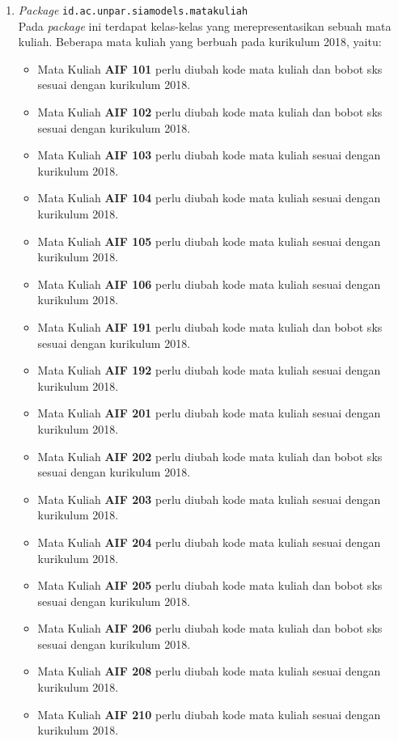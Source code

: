 \begin{enumerate}
	\item \textit{Package} \texttt{id.ac.unpar.siamodels.matakuliah} \\
	Pada \textit{package} ini terdapat kelas-kelas yang merepresentasikan sebuah mata kuliah. Beberapa mata kuliah yang berbuah pada kurikulum 2018, yaitu:
	\begin{itemize}
		\item Mata Kuliah \textbf{AIF 101} perlu diubah kode mata kuliah dan bobot sks sesuai dengan kurikulum 2018.
		\item Mata Kuliah \textbf{AIF 102} perlu diubah kode mata kuliah dan bobot sks sesuai dengan kurikulum 2018.
		\item Mata Kuliah \textbf{AIF 103} perlu diubah kode mata kuliah sesuai dengan kurikulum 2018.
		\item Mata Kuliah \textbf{AIF 104} perlu diubah kode mata kuliah sesuai dengan kurikulum 2018.
		\item Mata Kuliah \textbf{AIF 105} perlu diubah kode mata kuliah sesuai dengan kurikulum 2018.
		\item Mata Kuliah \textbf{AIF 106} perlu diubah kode mata kuliah sesuai dengan kurikulum 2018.
		\item Mata Kuliah \textbf{AIF 191} perlu diubah kode mata kuliah dan bobot sks sesuai dengan kurikulum 2018.
		\item Mata Kuliah \textbf{AIF 192} perlu diubah kode mata kuliah sesuai dengan kurikulum 2018.
		\item Mata Kuliah \textbf{AIF 201} perlu diubah kode mata kuliah sesuai dengan kurikulum 2018.
		\item Mata Kuliah \textbf{AIF 202} perlu diubah kode mata kuliah dan bobot sks sesuai dengan kurikulum 2018.
		\item Mata Kuliah \textbf{AIF 203} perlu diubah kode mata kuliah sesuai dengan kurikulum 2018.
		\item Mata Kuliah \textbf{AIF 204} perlu diubah kode mata kuliah sesuai dengan kurikulum 2018.
		\item Mata Kuliah \textbf{AIF 205} perlu diubah kode mata kuliah dan bobot sks sesuai dengan kurikulum 2018.
		\item Mata Kuliah \textbf{AIF 206} perlu diubah kode mata kuliah dan bobot sks sesuai dengan kurikulum 2018.
		\item Mata Kuliah \textbf{AIF 208} perlu diubah kode mata kuliah sesuai dengan kurikulum 2018.
		\item Mata Kuliah \textbf{AIF 210} perlu diubah kode mata kuliah sesuai dengan kurikulum 2018.

\end{itemize}
\end{enumerate}
